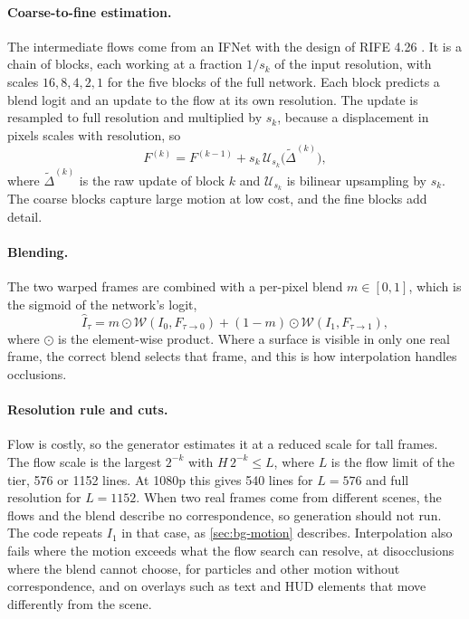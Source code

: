 \paragraph{Coarse-to-fine estimation.} The intermediate flows come from an IFNet with the design of RIFE 4.26 \cite{huang2022rife}. It is a chain of blocks, each working at a fraction $1/s_k$ of the input resolution, with scales $16,8,4,2,1$ for the five blocks of the full network. Each block predicts a blend logit and an update to the flow at its own resolution. The update is resampled to full resolution and multiplied by $s_k$, because a displacement in pixels scales with resolution, so
\begin{equation}
F^{(k)}=F^{(k-1)}+s_k\,\mathcal U_{s_k}\big(\tilde\Delta^{(k)}\big),\label{eq:bg-c2f}
\end{equation}
where $\tilde\Delta^{(k)}$ is the raw update of block $k$ and $\mathcal U_{s_k}$ is bilinear upsampling by $s_k$. The coarse blocks capture large motion at low cost, and the fine blocks add detail.

\paragraph{Blending.} The two warped frames are combined with a per-pixel blend $m\in[0,1]$, which is the sigmoid of the network's logit,
\begin{equation}
\hat I_\tau=m\odot\mathcal W(I_0,F_{\tau\to0})+(1-m)\odot\mathcal W(I_1,F_{\tau\to1}),\label{eq:bg-blend}
\end{equation}
where $\odot$ is the element-wise product. Where a surface is visible in only one real frame, the correct blend selects that frame, and this is how interpolation handles occlusions.

\paragraph{Resolution rule and cuts.} Flow is costly, so the generator estimates it at a reduced scale for tall frames. The flow scale is the largest $2^{-k}$ with $H\,2^{-k}\le L$, where $L$ is the flow limit of the tier, 576 or 1152 lines. At 1080p this gives 540 lines for $L=576$ and full resolution for $L=1152$. When two real frames come from different scenes, the flows and the blend describe no correspondence, so generation should not run. The code repeats $I_1$ in that case, as \cref{sec:bg-motion} describes. Interpolation also fails where the motion exceeds what the flow search can resolve, at disocclusions where the blend cannot choose, for particles and other motion without correspondence, and on overlays such as text and HUD elements that move differently from the scene.

